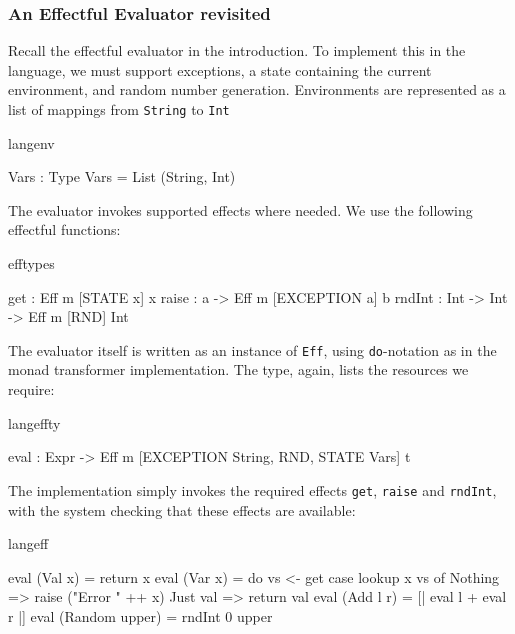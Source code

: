 \subsubsection{An Effectful Evaluator revisited}

Recall the effectful evaluator in the introduction. To implement this
in the \Eff{} language, we must support exceptions, a state containing the
current environment, and random number generation. Environments are
represented as a list of mappings from \texttt{String} to \texttt{Int}

\begin{SaveVerbatim}{langenv}

Vars : Type
Vars = List (String, Int)

\end{SaveVerbatim}

\noindent
The evaluator invokes supported effects where needed. We use the following
effectful functions:

\begin{SaveVerbatim}{efftypes}

get    : Eff m [STATE x] x
raise  : a -> Eff m [EXCEPTION a] b
rndInt : Int -> Int -> Eff m [RND] Int

\end{SaveVerbatim}

\noindent
The evaluator itself is written as an instance of \texttt{Eff}, using
\texttt{do}-notation as in the monad transformer implementation. The 
type, again, lists the resources we require:

\begin{SaveVerbatim}{langeffty}

eval : Expr -> 
       Eff m [EXCEPTION String, RND, STATE Vars] t

\end{SaveVerbatim}

\noindent
The implementation simply invokes the required effects \texttt{get},
\texttt{raise} and \texttt{rndInt}, with the \Eff{} system checking that
these effects are available:

\begin{SaveVerbatim}{langeff}

eval (Val x) = return x
eval (Var x) = 
    do vs <- get
       case lookup x vs of
            Nothing => raise ("Error " ++ x)
            Just val => return val
eval (Add l r) = [| eval l + eval r |]
eval (Random upper) = rndInt 0 upper

\end{SaveVerbatim}

